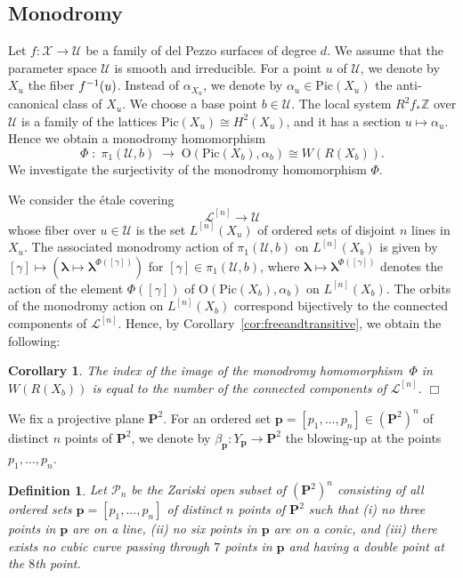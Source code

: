 \documentclass{math}
\theoremstyle{plain}
\newtheorem{corollary}[theorem]{Corollary}
\newtheorem{definition}[theorem]{Definition}
\numberwithin{equation}{section}
\newcommand{\qed}{\hfill {$\Box$}}
\newcommand{\ZZ}{\mathord{\mathbb Z}}
\newcommand{\LLL}{\mathord{\mathcal L}}
\newcommand{\PPP}{\mathord{\mathcal P}}
\newcommand{\UUU}{\mathord{\mathcal U}}
\newcommand{\XXX}{\mathord{\mathcal X}}
\newcommand{\inv}{\sp{-1}}
\DeclareMathOperator{\Image}{Image}
\newcommand{\OG}{\mathord{\mathrm{O}}}
\newcommand{\pione}{\pi_1}
\newcommand{\Pic}{\mathrm{Pic}}
\newcommand{\mon}{\Phi}
\newcommand{\bfP}{\mathbf{P}}
\newcommand{\blambda}{\bm{\lambda}}
\newcommand{\bp}{\bm{p}}
\begin{document}
\subsection{Monodromy}\label{subsec:monodromy}
%
Let $f\colon \XXX \to \UUU$ be a family of del Pezzo surfaces of degree  $d$.
We assume that the parameter space $\UUU$ is smooth and irreducible.
For a point $u$ of $\UUU$, we denote by $X_u$ the fiber $f\inv(u)$.
Instead of $\alpha_{X_u}$, we denote by 
$\alpha_u\in \Pic(X_u)$ 
the anti-canonical class of $X_u$.
We choose a base point $b\in \UUU$.
The local system 
$R^2f_* \ZZ$ over $\UUU$
is a family of the lattices $\Pic(X_u)\cong H^2(X_u)$,
and it has a section $u\mapsto \alpha_{u}$.
Hence we obtain a monodromy homomorphism 
%
\begin{equation}\label{eq:mon}
\mon\;\colon\; \pione(\UUU, b)\;\to\; \OG(\Pic(X_b), \alpha_b)\cong W(R(X_b)).
\end{equation}
%
We investigate  the surjectivity of the monodromy homomorphism $\mon$. %
%
\par
%
We consider the \'etale covering
\[
\LLL^{[n]}\to\UUU
\]
whose fiber over $u\in\UUU$ is the set $L^{[n]}(X_u)$ of ordered sets of disjoint $n$ lines in $X_u$.
The associated monodromy action 
of $\pione(\UUU, b)$ on $L^{[n]}(X_b)$ 
is given by $[\gamma]\mapsto(\blambda\mapsto\blambda^{ \mon([\gamma])})$
for $[\gamma]\in \pione(\UUU, b)$,
where $\blambda\mapsto \blambda^{ \mon([\gamma])}$  
denotes the action of the element $ \mon([\gamma])$ of 
$ \OG(\Pic(X_b),  \alpha_b)$ on $L^{[n]}(X_b)$.
The orbits of the monodromy action on $L^{[n]}(X_b)$ 
correspond bijectively to the connected components of $\LLL^{[n]}$.
Hence, by Corollary~\ref{cor:freeandtransitive}, we obtain the following:
%
\begin{corollary}\label{cor:index}
The index of the image %
of  the monodromy homomorphism~$\mon$ in $W(R(X_b))$ is 
equal to the number of the connected components of $\LLL^{[n]}$.
\qed
\end{corollary}
%
We fix a projective plane ${\bfP}^{2}$.
For an ordered set  $\bp= [p_1, \dots, p_n]\in ({\bfP}^{2})^n$ of distinct $n$ points of ${\bfP}^{2}$, 
we denote by 
$\beta_{\bp}\colon  Y_{\bp}\to {\bfP}^{2}$
 the blowing-up at 
the points $p_1, \dots, p_n$.
%
\begin{definition}\label{def:PPPn}
Let $\PPP_n$ be the Zariski open subset of $({\bfP}^{2})^n$
consisting of all ordered sets  $\bp=[p_1, \dots, p_n]$ of distinct $n$ points of ${\bfP}^{2}$
such that 
%
(i) no three points in  $\bp$ are on a line,
(ii) no six points in  $\bp$ are on a conic, and 
(iii) there exists no cubic curve passing through $7$  points in  $\bp$
and having a double point at the $8$th point.
%
\end{definition}
\end{document}
